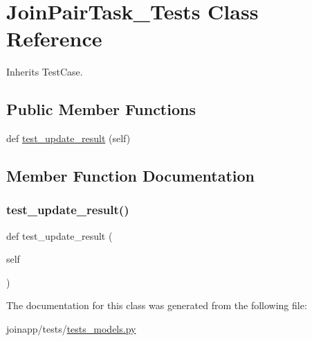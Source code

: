\hypertarget{classjoinapp_1_1tests_1_1tests__models_1_1_join_pair_task___tests}{}\section{Join\+Pair\+Task\+\_\+\+Tests Class Reference}
\label{classjoinapp_1_1tests_1_1tests__models_1_1_join_pair_task___tests}


Inherits Test\+Case.

\subsection*{Public Member Functions}
\begin{DoxyCompactItemize}
\item 
def \mbox{\hyperlink{classjoinapp_1_1tests_1_1tests__models_1_1_join_pair_task___tests_a1466bd141ad5f6473d022ba00c25dfdb}{test\+\_\+update\+\_\+result}} (self)
\end{DoxyCompactItemize}


\subsection{Member Function Documentation}
\mbox{\label{classjoinapp_1_1tests_1_1tests__models_1_1_join_pair_task___tests_a1466bd141ad5f6473d022ba00c25dfdb}} 
\subsubsection{\texorpdfstring{test\_update\_result()}{test\_update\_result()}}
{\footnotesize\ttfamily def test\+\_\+update\+\_\+result (\begin{DoxyParamCaption}\item[{}]{self }\end{DoxyParamCaption})}



The documentation for this class was generated from the following file\+:\begin{DoxyCompactItemize}
\item 
joinapp/tests/\mbox{\hyperlink{tests__models_8py}{tests\+\_\+models.\+py}}\end{DoxyCompactItemize}
